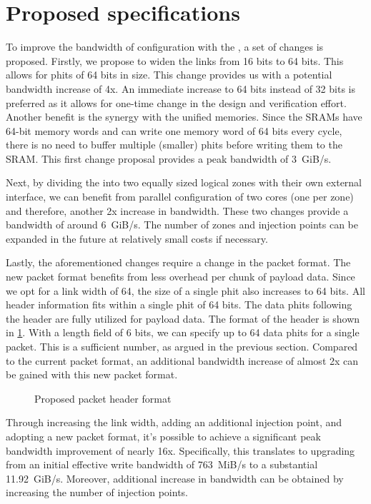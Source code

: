 \section{Proposed specifications}
\label{sec:proposed_noc}
To improve the bandwidth of configuration with the \confignoc{}, a set of changes is proposed. Firstly, we propose to widen the links from 16 bits to 64 bits.
This allows for phits of 64 bits in size.
This change provides us with a potential bandwidth increase of 4x.
An immediate increase to 64 bits instead of 32 bits is preferred as it allows for one-time change in the design and verification effort.
Another benefit is the synergy with the unified memories.
Since the SRAMs have 64-bit memory words and can write one memory word of 64 bits every cycle, there is no need to buffer multiple (smaller) phits before writing them to the SRAM.
This first change proposal provides a peak bandwidth of \SI{3}{GiB/s}.

Next, by dividing the \confignoc{} into two equally sized logical zones with their own external interface, we can benefit from parallel configuration of two cores (one per zone) and therefore, another 2x increase in bandwidth.
These two changes provide a bandwidth of around \SI{6}{GiB/s}. 
The number of zones and injection points can be expanded in the future at relatively small costs if necessary.

Lastly, the aforementioned changes require a change in the packet format.
The new packet format benefits from less overhead per chunk of payload data.
Since we opt for a link width of 64, the size of a single phit also increases to 64 bits.
All header information fits within a single phit of 64 bits.
The data phits following the header are fully utilized for payload data.
The format of the header is shown in \cref{fig:packet_format_header_new}.
With a length field of 6 bits, we can specify up to 64 data phits for a single packet.
This is a sufficient number, as argued in the previous section. 
Compared to the current packet format, an additional bandwidth increase of almost 2x can be gained with this new packet format.

\begin{figure}[hbtp]
    \centering
    \resizebox{\linewidth}{!}{
        
    }
    \caption{Proposed packet header format}
    \label{fig:packet_format_header_new}
\end{figure}

Through increasing the link width, adding an additional injection point, and adopting a new packet format, it's possible to achieve a significant peak bandwidth improvement of nearly 16x.
Specifically, this translates to upgrading from an initial effective write bandwidth of \SI{763}{MiB/s} to a substantial \SI{11.92}{GiB/s}.
Moreover, additional increase in bandwidth can be obtained by increasing the number of injection points.
